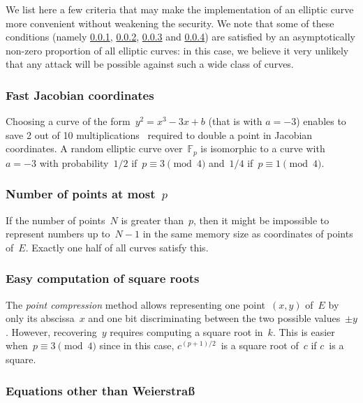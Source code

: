 \documentclass[twocolumn,letterpaper,10pt]{article}
\def\F{\mathbb{F}}
\begin{document}
We list here a few criteria that
may make the implementation of an elliptic curve more convenient
without weakening the security.
We note that some of these conditions
(namely \ref{sss:a=-3}, \ref{sss:few-points},
\ref{sss:easy-sqrt} and \ref{sss:other-eq}) are satisfied
by an asymptotically non-zero proportion of all elliptic curves:
in this case, we believe it very unlikely
that any attack will be possible against such a wide class of curves.

\subsubsection{Fast Jacobian coordinates}
\label{sss:a=-3}

Choosing a curve of the form~$y^2 = x^3 - 3 x + b$ (that is with $a=-3$)
enables to save 2 out of 10 multiplications~\cite{ieeep1363}
required to double a point in Jacobian coordinates.
A random elliptic curve over~$\F_p$
is isomorphic to a curve with~$a = -3$
with probability~$1/2$ if~$p ≡ 3 \pmod{4}$ and~$1/4$ if~$p ≡ 1 \pmod{4}$.

\subsubsection{Number of points at most~\texorpdfstring{$p$}{p}}
\label{sss:few-points}

If the number of points~$N$ is greater than~$p$,
then it might be impossible to represent numbers up to~$N-1$
in the same memory size as coordinates of points of~$E$.
Exactly one half of all curves satisfy this.

\subsubsection{Easy computation of square roots}
\label{sss:easy-sqrt}

The \emph{point compression} method allows representing
one point~$(x,y)$ of~$E$ by only its abscissa~$x$ and
one bit discriminating between the two possible values~$±y$.
However, recovering~$y$ requires computing a square root in~$k$.
This is easier when~$p ≡ 3 \pmod{4}$ since
in this case, $c^{(p+1)/2}$~is a square root of~$c$ if $c$~is a square.

\subsubsection{Equations other than Weierstraß}
\label{sss:other-eq}
\end{document}
